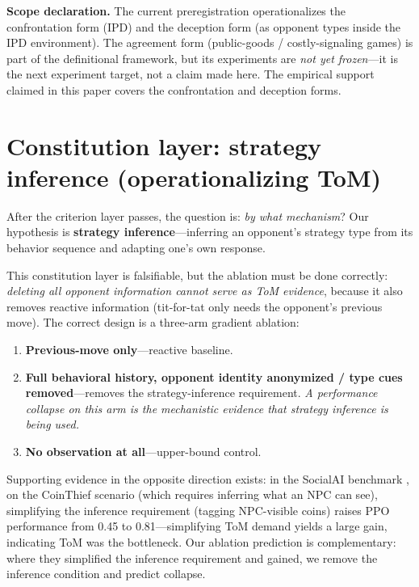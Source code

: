 \documentclass[11pt]{article}
\begin{document}
\textbf{Scope declaration.} The current preregistration operationalizes the confrontation form (IPD) and the deception form (as opponent types inside the IPD environment). The agreement form (public-goods / costly-signaling games) is part of the definitional framework, but its experiments are \emph{not yet frozen}---it is the next experiment target, not a claim made here. The empirical support claimed in this paper covers the confrontation and deception forms.

\section{Constitution layer: strategy inference (operationalizing ToM)}
\label{sec:constitution}

After the criterion layer passes, the question is: \emph{by what mechanism}? Our hypothesis is \textbf{strategy inference}---inferring an opponent's strategy type from its behavior sequence and adapting one's own response.

This constitution layer is falsifiable, but the ablation must be done correctly: \emph{deleting all opponent information cannot serve as ToM evidence}, because it also removes reactive information (tit-for-tat only needs the opponent's previous move). The correct design is a three-arm gradient ablation:

\begin{enumerate}
\item \textbf{Previous-move only}---reactive baseline.
\item \textbf{Full behavioral history, opponent identity anonymized / type cues removed}---removes the strategy-inference requirement. \emph{A performance collapse on this arm is the mechanistic evidence that strategy inference is being used.}
\item \textbf{No observation at all}---upper-bound control.
\end{enumerate}

Supporting evidence in the opposite direction exists: in the SocialAI benchmark \cite{kovac2021}, on the CoinThief scenario (which requires inferring what an NPC can see), simplifying the inference requirement (tagging NPC-visible coins) raises PPO performance from 0.45 to 0.81---simplifying ToM demand yields a large gain, indicating ToM was the bottleneck. Our ablation prediction is complementary: where they simplified the inference requirement and gained, we remove the inference condition and predict collapse.
\end{document}
